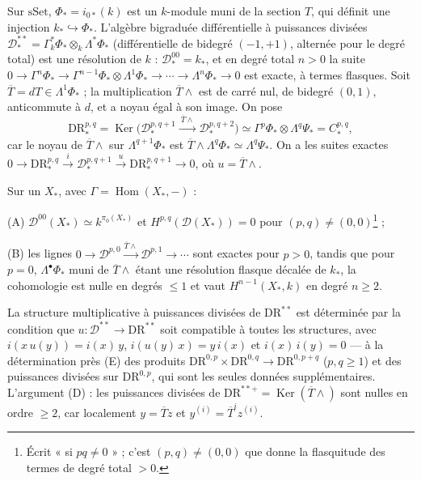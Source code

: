 \documentclass[11pt,a4paper]{article}
\begin{document}
Sur $\mathrm{sSet}$, $\Phi_* = i_{0*}(k)$ est un $k$-module muni de la section
$T$, qui définit une injection $k_* \hookrightarrow \Phi_*$. L'algèbre bigraduée
différentielle à puissances divisées
$\mathcal{D}^{**}_* = \Gamma^*_k\Phi_* \otimes_k \Lambda^*\Phi_*$ (différentielle
de bidegré $(-1,+1)$, alternée pour le degré total) est une résolution de $k$ :
$\mathcal{D}^{00}_* = k_*$, et en degré total $n > 0$ la suite $0 \to
\Gamma^n\Phi_* \to \Gamma^{n-1}\Phi_* \otimes \Lambda^1\Phi_* \to \cdots \to
\Lambda^n\Phi_* \to 0$ est exacte, à termes flasques. Soit $\overline{T} = dT
\in \Lambda^1\Phi_*$ ; la multiplication $\overline{T} \wedge$ est de carré nul,
de bidegré $(0,1)$, anticommute à $d$, et a noyau égal à son image. On pose
\[
\mathrm{DR}^{p,q}_* = \operatorname{Ker}\bigl(\mathcal{D}^{p,q+1}_* \xrightarrow{\ \overline{T}\wedge\ } \mathcal{D}^{p,q+2}_*\bigr) \simeq \Gamma^p\Phi_* \otimes \Lambda^q \Psi_* = C^{p,q}_* ,
\]
car le noyau de $\overline{T} \wedge$ sur $\Lambda^{q+1}\Phi_*$ est
$\overline{T} \wedge \Lambda^q\Phi_* \simeq \Lambda^q\Psi_*$. On a les suites
exactes $0 \to \mathrm{DR}^{p,q}_* \xrightarrow{i} \mathcal{D}^{p,q+1}_*
\xrightarrow{u} \mathrm{DR}^{p,q+1}_* \to 0$, où $u = \overline{T}\wedge$.

Sur un $X_*$, avec $\Gamma = \operatorname{Hom}(X_*, -)$ :

(A) $\mathcal{D}^{00}(X_*) \simeq k^{\pi_0(X_*)}$ et
$H^{p,q}(\mathcal{D}(X_*)) = 0$ pour $(p,q) \neq (0,0)$\footnote{Écrit
« si $pq \neq 0$ » ; c'est $(p,q) \neq (0,0)$ que donne la flasquitude des
termes de degré total $> 0$.} ;

(B) les lignes $0 \to \mathcal{D}^{p,0} \xrightarrow{\overline{T}\wedge}
\mathcal{D}^{p,1} \to \cdots$ sont exactes pour $p > 0$, tandis que pour $p =
0$, $\Lambda^\bullet\Phi_*$ muni de $\overline{T}\wedge$ étant une résolution
flasque décalée de $k_*$, la cohomologie est nulle en degrés $\leq 1$ et vaut
$H^{n-1}(X_*, k)$ en degré $n \geq 2$.

La structure multiplicative à puissances divisées de $\mathrm{DR}^{**}$ est
déterminée par la condition que $u : \mathcal{D}^{**} \to \mathrm{DR}^{**}$ soit
compatible à toutes les structures, avec $i(x\,u(y)) = i(x)\,y$, $i(u(y)\,x) =
y\,i(x)$ et $i(x)\,i(y) = 0$ — à la détermination près (E) des produits
$\mathrm{DR}^{0,p} \times \mathrm{DR}^{0,q} \to \mathrm{DR}^{0,p+q}$ ($p,q \geq
1$) et des puissances divisées sur $\mathrm{DR}^{0,p}$, qui sont les seules
données supplémentaires. L'argument (D) : les puissances divisées de
$\mathrm{DR}^{**+} = \operatorname{Ker}(\overline{T}\wedge)$ sont nulles en
ordre $\geq 2$, car localement $y = \overline{T}z$ et $y^{(i)} =
\overline{T}^i z^{(i)}$.
\end{document}
